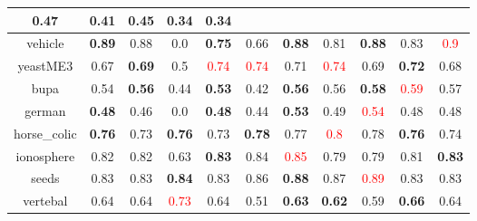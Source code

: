 \documentclass{article}%
\begin{document}
\begin{tabular}{c|cccccccccc}
{0.47
}&0.41&\textbf{0.45}&0.34&0.34\\%
\hline%
vehicle&\textbf{0.89}&0.88&0.0&\textbf{0.75}&0.66&\textbf{0.88}&0.81&\textbf{0.88}&0.83&\textcolor{red}{ 
0.9
}\\%
\hline%
yeastME3&0.67&\textbf{0.69}&0.5&\textcolor{red}{ 
0.74
}&\textcolor{red}{ 
0.74
}&0.71&\textcolor{red}{ 
0.74
}&0.69&\textbf{0.72}&0.68\\%
\hline%
bupa&0.54&\textbf{0.56}&0.44&\textbf{0.53}&0.42&\textbf{0.56}&0.56&\textbf{0.58}&\textcolor{red}{ 
0.59
}&0.57\\%
\hline%
german&\textbf{0.48}&0.46&0.0&\textbf{0.48}&0.44&\textbf{0.53}&0.49&\textcolor{red}{ 
0.54
}&0.48&0.48\\%
\hline%
horse\_colic&\textbf{0.76}&0.73&\textbf{0.76}&0.73&\textbf{0.78}&0.77&\textcolor{red}{ 
0.8
}&0.78&\textbf{0.76}&0.74\\%
\hline%
ionosphere&0.82&0.82&0.63&\textbf{0.83}&0.84&\textcolor{red}{ 
0.85
}&0.79&0.79&0.81&\textbf{0.83}\\%
\hline%
seeds&0.83&0.83&\textbf{0.84}&0.83&0.86&\textbf{0.88}&0.87&\textcolor{red}{ 
0.89
}&0.83&0.83\\%
\hline%
vertebal&0.64&0.64&\textcolor{red}{ 
0.73
}&0.64&0.51&\textbf{0.63}&\textbf{0.62}&0.59&\textbf{0.66}&0.64\\%
\hline%
\end{tabular}

%
\end{document}
